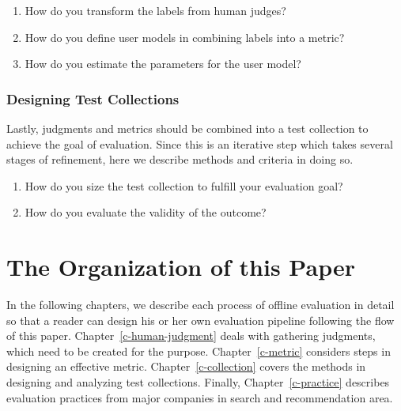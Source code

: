 \begin{enumerate}
	\item How do you transform the labels from human judges?
	\item How do you define user models in combining labels into a metric?
	\item How do you estimate the parameters for the user model?
\end{enumerate}

\subsubsection{Designing Test Collections}

Lastly, judgments and metrics should be combined into a test collection to achieve the goal of evaluation. Since this is an iterative step which takes several stages of refinement, here we describe methods and criteria in doing so. 

\begin{enumerate}
	\item How do you size the test collection to fulfill your evaluation goal?
	\item How do you evaluate the validity of the outcome?
\end{enumerate}


\section{The Organization of this Paper}

In the following chapters, we describe each process of offline evaluation in detail so that a reader can design his or her own evaluation pipeline following the flow of this paper. Chapter~\ref{c-human-judgment} deals with gathering judgments, which need to be created for the purpose. Chapter~\ref{c-metric} considers steps in designing an effective metric. Chapter~\ref{c-collection} covers the methods in designing and analyzing test collections. Finally, Chapter~\ref{c-practice} describes evaluation practices from major companies in search and recommendation area.

